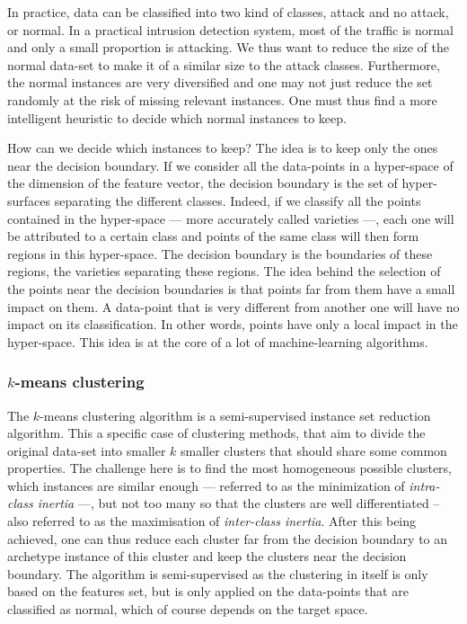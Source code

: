 In practice, data can be classified into two kind of classes, attack and no attack, or normal. In a practical intrusion detection system, most of the traffic is normal and only a small proportion is attacking. We thus want to reduce the size of the normal data-set to make it of a similar size to the attack classes. Furthermore, the normal instances are very diversified and one may not just reduce the set randomly at the risk of missing relevant instances. One must thus find a more intelligent heuristic to decide which normal instances to keep.

How can we decide which instances to keep? The idea is to keep only the ones near the decision boundary. If we consider all the data-points in a hyper-space of the dimension of the feature vector, the decision boundary is the set of hyper-surfaces separating the different classes. Indeed, if we classify all the points contained in the hyper-space --- more accurately called varieties ---, each one will be attributed to a certain class and points of the same class will then form regions in this hyper-space. The decision boundary is the boundaries of these regions, the varieties separating these regions. The idea behind the selection of the points near the decision boundaries is that points far from them have a small impact on them. A data-point that is very different from another one will have no impact on its classification. In other words, points have only a local impact in the hyper-space. This idea is at the core of a lot of machine-learning algorithms.

\subsubsection{$k$-means clustering}
The $k$-means clustering algorithm is a semi-supervised instance set reduction algorithm. This a specific case of clustering methods, that aim to divide the original data-set into smaller $k$ smaller clusters that should share some common properties. The challenge here is to find the most homogeneous possible clusters, which instances are similar enough --- referred to as the minimization of \emph{intra-class inertia} ---, but not too many so that the clusters are well differentiated -- also referred to as the maximisation of \emph{inter-class inertia}. After this being achieved, one can thus reduce each cluster far from the decision boundary to an archetype instance of this cluster and keep the clusters near the decision boundary. The algorithm is semi-supervised as the clustering in itself is only based on the features set, but is only applied on the data-points that are classified as normal, which of course depends on the target space.

